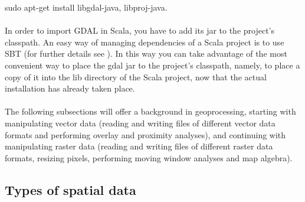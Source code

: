 \documentclass {article}
\begin{document}
sudo apt-get install libgdal-java, libproj-java.    \\
\\
In order to import GDAL in Scala, you have to add its jar to the project's classpath. An easy way of managing dependencies of a Scala project is to use SBT (for further details see \cite{tesileanu_using_2017}). In this way you can take advantage of the most convenient way to place the gdal jar to the project's classpath, namely, to place a copy of it into the lib directory of the Scala project, now that the actual installation has already taken place. \\ 
\\
The following subsections will offer a background in geoprocessing, starting with manipulating vector data (reading and writing files of different vector data formats and performing overlay and proximity analyses), and continuing with manipulating raster data (reading and writing files of different raster data formats, resizing pixels, performing moving window analyses and map algebra).    

\subsection {Types of spatial data}
\end{document}
